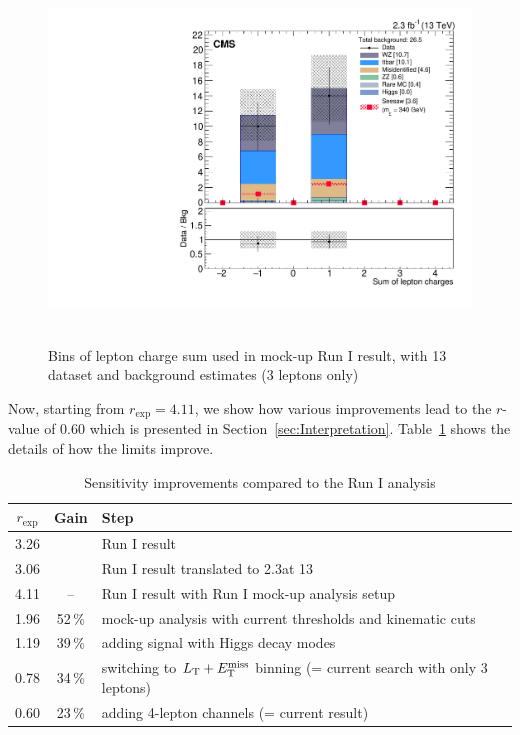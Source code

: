 \begin{figure}[h]
\begin{center}
	\includegraphics[width=.7\textwidth]{Appendix/L3Tau0_Q}\
	\caption{Bins of lepton charge sum used in mock-up Run I result, with 13\,\TeV dataset and background estimates (3 leptons only)
	\label{fig:app:RunI}}
\end{center}
\end{figure}

Now, starting from $r_\textrm{exp} = 4.11$, we show how various improvements lead to the $r$-value of 0.60 which is presented in Section~\ref{sec:Interpretation}. Table~\ref{tab:improvements} shows the details of how the limits improve.

\begin{table}[h]
\centering
\caption{Sensitivity improvements compared to the Run I analysis} \label{tab:improvements}
\begin{tabular}{c c l}
\hline\hline
$r_\textrm{exp}$ & Gain & Step \\
\hline
\hline
3.26 & & Run I result \\
3.06 & & Run I result translated to 2.3\fbinv at 13\,\TeV\\
\hline
4.11 & -- & Run I result with Run I mock-up analysis setup \\
1.96 & 52\,\% & mock-up analysis with current \pt thresholds and kinematic cuts \\
1.19 & 39\,\% & adding signal with Higgs decay modes \\
0.78 & 34\,\% & switching to $L_\textrm{T} + E_{\mathrm{T}}^{\text{miss}}$ binning (= current search with only 3 leptons) \\
0.60 & 23\,\% & adding 4-lepton channels (= current result) \\
\end{tabular}
\end{table}
